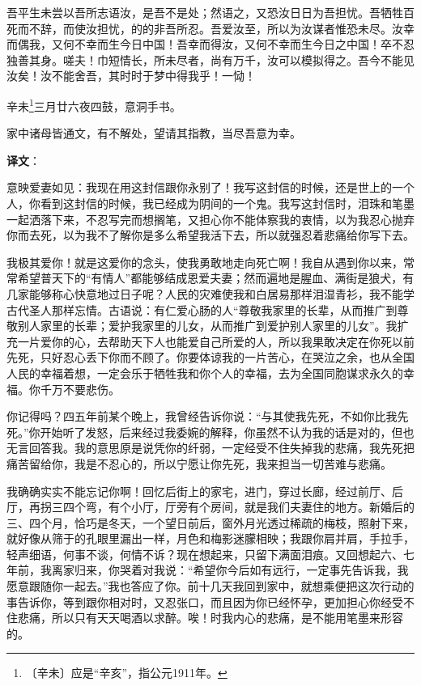 \documentclass[12pt,UTF-8,openany]{ctexbook}
\begin{document}
\begin{normalsize}
    吾平生未尝以吾所志语汝，是吾不是处；然语之，又恐汝日日为吾担忧。吾牺牲百死而不辞，而使汝担忧，的的非吾所忍。吾爱汝至，所以为汝谋者惟恐未尽。汝幸而偶我，又何不幸而生今日中国！吾幸而得汝，又何不幸而生今日之中国！卒不忍独善其身。嗟夫！巾短情长，所未尽者，尚有万千，汝可以模拟得之。吾今不能见汝矣！汝不能舍吾，其时时于梦中得我乎！一恸！
    
    辛未\footnote{〔辛未〕应是“辛亥”，指公元1911年。}三月廿六夜四鼓，意洞手书。
    
    家中诸母皆通文，有不解处，望请其指教，当尽吾意为幸。
\end{normalsize}


\newpage

\textbf{译文}：

\vspace{1em}

\begin{normalsize}
    
    意映爱妻如见：我现在用这封信跟你永别了！我写这封信的时候，还是世上的一个人，你看到这封信的时候，我已经成为阴间的一个鬼。我写这封信时，泪珠和笔墨一起洒落下来，不忍写完而想搁笔，又担心你不能体察我的衷情，以为我忍心抛弃你而去死，以为我不了解你是多么希望我活下去，所以就强忍着悲痛给你写下去。
    
    我极其爱你！就是这爱你的念头，使我勇敢地走向死亡啊！我自从遇到你以来，常常希望普天下的“有情人”都能够结成恩爱夫妻；然而遍地是腥血、满街是狼犬，有几家能够称心快意地过日子呢？人民的灾难使我和白居易那样泪湿青衫，我不能学古代圣人那样忘情。古语说：有仁爱心肠的人“尊敬我家里的长辈，从而推广到尊敬别人家里的长辈；爱护我家里的儿女，从而推广到爱护别人家里的儿女”。我扩充一片爱你的心，去帮助天下人也能爱自己所爱的人，所以我果敢决定在你死以前先死，只好忍心丢下你而不顾了。你要体谅我的一片苦心，在哭泣之余，也从全国人民的幸福着想，一定会乐于牺牲我和你个人的幸福，去为全国同胞谋求永久的幸福。你千万不要悲伤。
    
    你记得吗？四五年前某个晚上，我曾经告诉你说：“与其使我先死，不如你比我先死。”你开始听了发怒，后来经过我委婉的解释，你虽然不认为我的话是对的，但也无言回答我。我的意思原是说凭你的纤弱，一定经受不住失掉我的悲痛，我先死把痛苦留给你，我是不忍心的，所以宁愿让你先死，我来担当一切苦难与悲痛。
    
    我确确实实不能忘记你啊！回忆后街上的家宅，进门，穿过长廊，经过前厅、后厅，再拐三四个弯，有个小厅，厅旁有个房间，就是我们夫妻住的地方。新婚后的三、四个月，恰巧是冬天，一个望日前后，窗外月光透过稀疏的梅枝，照射下来，就好像从筛于的孔眼里漏出一样，月色和梅影迷朦相映；我跟你肩并肩，手拉手，轻声细语，何事不谈，何情不诉？现在想起来，只留下满面泪痕。又回想起六、七年前，我离家归来，你哭着对我说：“希望你今后如有远行，一定事先告诉我，我愿意跟随你一起去。”我也答应了你。前十几天我回到家中，就想乘便把这次行动的事告诉你，等到跟你相对时，又忍张口，而且因为你已经怀孕，更加担心你经受不住悲痛，所以只有天天喝酒以求醉。唉！时我内心的悲痛，是不能用笔墨来形容的。
    

\end{normalsize}
\end{document}
